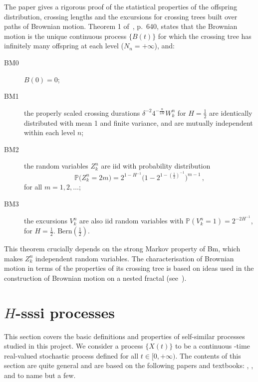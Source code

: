 \documentclass[a4paper]{article}
\newcommand{\pr}{\mathbb{P}}
\begin{document}
The paper \cite{ECP1673} gives a rigorous proof of the statistical properties of
the offspring distribution, crossing lengths and the excursions for crossing trees
built over paths of Brownian motion. Theorem 1 of~\cite{ECP1673}, p.~640, states
that the Brownian motion is the unique continuous process $\{B(t)\}$ for which the
crossing tree has infinitely many offspring at each level ($N_n = +\infty$), and:
\begin{description}
    \item[BM0] $B(0) = 0$;
    \item[BM1] the properly scaled crossing durations $\delta^{-2} 4^{-\frac{n}{2H}} W_k^n$
    for $H = \tfrac{1}{2}$ are identically distributed with mean 1 and finite variance,
    and are mutually independent within each level $n$;
    \item[BM2] the random variables $Z_k^n$ are iid with probability distribution
    \[ \pr\bigl(Z_k^n=2m\bigr) = 2^{1-H^{-1}}\bigl(1-2^{1-(\frac{1}{2})^{-1}}\bigr)^{m-1} \,,\]
    for all $m=1,2,\ldots$;
    \item[BM3] the excursions $V_k^n$ are also iid random variables with 
    $\pr( V_k^n = 1 ) = 2^{-2H^{-1}}$, for $H = \tfrac{1}{2}$.
    $\text{Bern}(\tfrac{1}{2})$.
\end{description}
This theorem crucially depends on the strong Markov property of Bm, which makes $Z_k^n$
independent random variables. The characterisation of Brownian motion in terms of
the properties of its crossing tree is based on ideas used in the construction of
Brownian motion on a nested fractal (see~\cite{BarlowPerkins88}).



\section{$H$-sssi processes} %
\label{sec:h_sssi_processes}

This section covers the basic definitions and properties of self-similar processes
studied in this project. We consider a process $\bigl\{X(t)\bigr\}$ to be a continuous
-time real-valued stochastic process defined for all $t\in [0,+\infty)$. The contents
of this section are quite general and are based on the following papers and textbooks:
\cite{bulinskii2005teoriya2516755}, \cite{Bai20141710}, \cite{Chronopoulou:1114288}
\cite{embrechts2000introduction} and \cite{embrechtsselfsimilar} to name but a few.
\end{document}
